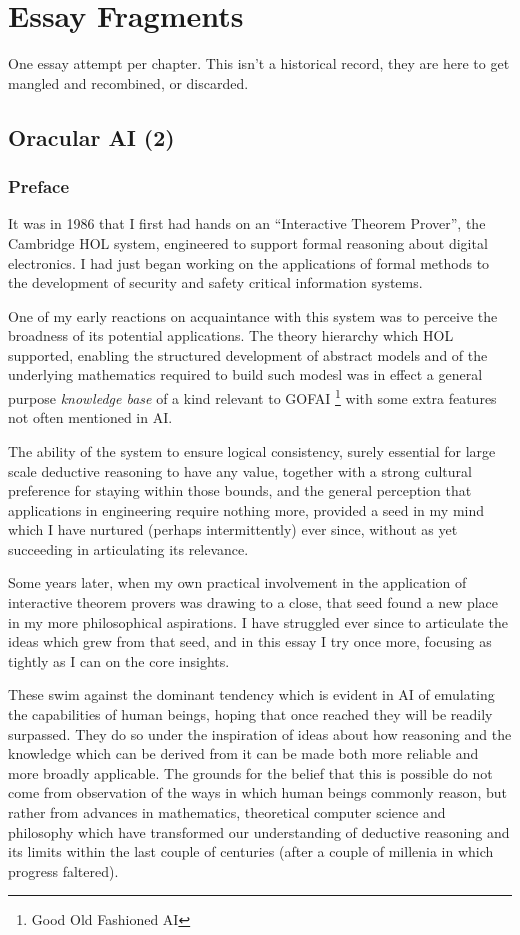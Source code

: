 \documentclass[10pt,titlepage]{book}
\begin{document}
\part{Essay Fragments}

One essay attempt per chapter.
This isn't a historical record, they are here to get mangled and recombined, or discarded.

\chapter{Oracular AI (2)}

\section*{Preface}

It was in 1986 that I first had hands on an ``Interactive Theorem Prover'', the Cambridge HOL system,
engineered to support formal reasoning about digital electronics.
I had just began working on the applications of formal methods to the development of security and safety critical information systems.

One of my early reactions on acquaintance with this system was to perceive the broadness of its potential applications.
The theory hierarchy which HOL supported, enabling the structured development of abstract models and of  the underlying mathematics required to build such modesl was in effect a general purpose \emph{knowledge base} of a kind relevant to GOFAI \footnote{Good Old Fashioned AI} with some extra features not often mentioned in AI.

The ability of the system to ensure logical consistency, surely essential for large scale deductive reasoning to have any value, together with a strong cultural preference for staying within those bounds, and the general perception that applications in engineering require nothing more, provided a seed in my mind which I have nurtured (perhaps intermittently) ever since, without as yet succeeding in articulating its relevance.

Some years later, when my own practical involvement in the application of interactive theorem provers was drawing to a close, that seed found a new place in my more philosophical aspirations.
I have struggled ever since to articulate the ideas which grew from that seed, and in this essay I try once more, focusing as tightly as I can on the core insights.

These swim against the dominant tendency which is evident in AI of emulating the capabilities of human beings, hoping that once reached they will be readily surpassed.
They do so under the inspiration of ideas about how reasoning and the knowledge which can be derived from it can be made both more reliable and more broadly applicable.
The grounds for the belief that this is possible do not come from observation of the ways in which human beings commonly reason, but rather from advances in mathematics, theoretical computer science and philosophy which have transformed our understanding of deductive reasoning and its limits within the last couple of centuries (after a couple of millenia in which progress faltered).
\end{document}
